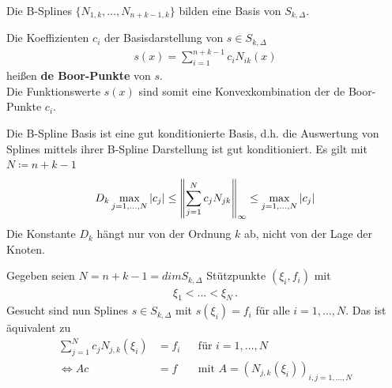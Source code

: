 \begin{Fole}
  Die B-Splines $\{N_{1,k},\ldots,N_{n+k-1,k}\}$ bilden eine Basis von 
  $S_{k,\Delta}$.

  Die Koeffizienten $c_i$ der Basisdarstellung von $s \in S_{k,\Delta}$
  \begin{gather*}
    s(x)=\sum_{i=1}^{n+k-1}c_iN_{ik}(x)
  \end{gather*}
  heißen \textbf{de Boor-Punkte} von $s$. \\
  Die Funktionswerte $s(x)$ sind somit eine
  Konvexkombination der de Boor-Punkte $c_i$.
\end{Fole}


\begin{Beme}
  Die B-Spline Basis ist eine gut konditionierte Basis, d.h.
  die Auswertung von Splines mittels ihrer B-Spline
  Darstellung ist gut konditioniert.
  Es gilt mit $N\coloneqq n+k-1$
  \begin{gather*}
    D_k \max_{j=1,\ldots, N} |c_j| 
    \leq \nn[\sum^N_{j=1} c_j N_{jk}]_{\infty}
    \leq \max_{j=1,\ldots, N} | c_j|
  \end{gather*}
  Die Konstante $D_k$ hängt nur von der Ordnung $k$ ab, nicht
  von der Lage der Knoten.
\end{Beme}


\label{6.2.13}
Gegeben seien $N=n+k-1=dimS_{k,\Delta}$ Stützpunkte $(\xi_i,f_i)$
mit
\begin{gather*}
  \xi_1<\dots<\xi_N\,.
\end{gather*}
Gesucht sind nun Splines $s\in S_{k,\Delta}$ 
mit $s(\xi_i)=f_i$ für alle $i=1, \dots, N$.
Das ist äquivalent zu 
\begin{align}
  \sum_{j=1}^N c_jN_{j,k}(\xi_i)&=f_i &&\text{für }i=1,\dots, N
                                         \label{VI.2.8}
  \\\nonumber
  \Leftrightarrow Ac&=f &&\text{mit } A=(N_{j,k}(\xi_i))_{i,j=1,\dots,N}
\end{align}

